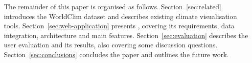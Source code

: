 
The remainder of this paper is organised as follows. Section~\ref{sec:related} introduces the WorldClim dataset
and describes existing climate visualisation tools. Section~\ref{sec:web-application} presents \webappname{},
covering its requirements, data integration, architecture and main features. Section~\ref{sec:evaluation} describes
the user evaluation and its results, also covering some discussion questions. Section~\ref{sec:conclusions} 
concludes the paper and outlines the future work.